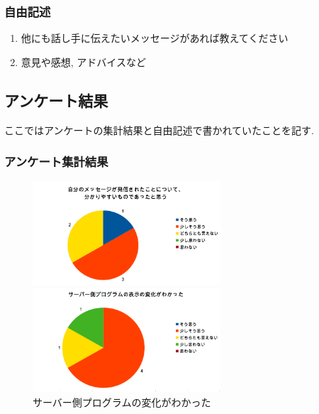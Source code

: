 \documentclass{funthesis}
\begin{document}
\subsubsection{自由記述}
\renewcommand{\labelenumi}{\arabic{enumi}}
\begin{enumerate}
 \item 他にも話し手に伝えたいメッセージがあれば教えてください
 \item 意見や感想, アドバイスなど
\end{enumerate}


\subsection{アンケート結果}
ここではアンケートの集計結果と自由記述で書かれていたことを記す. 

\subsubsection{アンケート集計結果}
\begin{figure}[H]
 \begin{minipage}{0.5\hsize}
  \begin{center}
  \includegraphics[width=70mm]{./img/question1.png}
  \end{center}
  \caption{自分のメッセージが発信されたこと\newline についてわかりやすかったと思う}
  \label{question1}
 \end{minipage}
 \begin{minipage}{0.5\hsize}
  \begin{center}
  \includegraphics[width=70mm]{./img/question2.png}
  \end{center}
  \caption{サーバー側プログラムの変化\newline がわかった}
  \label{question2}
  \end{minipage}
  \end{figure}
\end{document}
